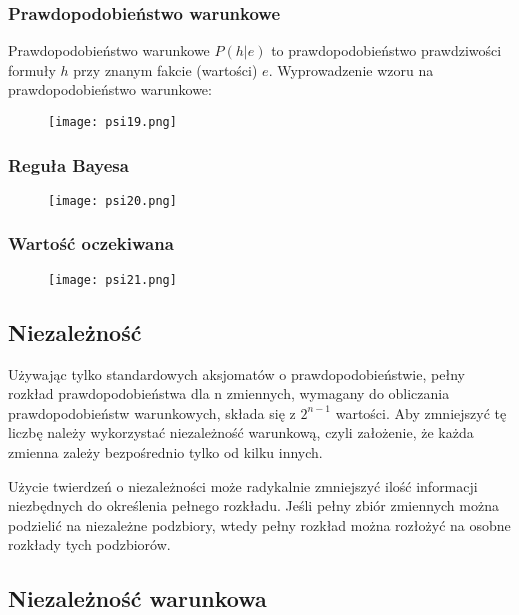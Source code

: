 \documentclass[a4paper,15pt]{article}
\begin{document}
\subsubsection{Prawdopodobieństwo warunkowe}
Prawdopodobieństwo warunkowe $P(h | e)$ to prawdopodobieństwo prawdziwości formuły $h$ przy znanym fakcie (wartości) $e$.
Wyprowadzenie wzoru na prawdopodobieństwo warunkowe:

\begin{figure}[H]
\centerline{\texttt{[image: psi19.png]}}
\end{figure}


\subsubsection{Reguła Bayesa}

\begin{figure}[H]
\centerline{\texttt{[image: psi20.png]}}
\end{figure}


\subsubsection{Wartość oczekiwana}

\begin{figure}[H]
\centerline{\texttt{[image: psi21.png]}}
\end{figure}

\subsection{Niezależność}

Używając tylko standardowych aksjomatów o prawdopodobieństwie, pełny rozkład prawdopodobieństwa dla n zmiennych, wymagany do obliczania prawdopodobieństw warunkowych, składa się z $2^{n-1}$ wartości. Aby zmniejszyć tę liczbę należy wykorzystać niezależność warunkową, czyli założenie, że każda zmienna zależy bezpośrednio tylko od kilku innych.

Użycie twierdzeń o niezależności może radykalnie zmniejszyć ilość informacji niezbędnych do określenia pełnego rozkładu. Jeśli pełny zbiór zmiennych można podzielić na niezależne podzbiory, wtedy pełny rozkład można rozłożyć na osobne rozkłady tych podzbiorów. 

\subsection{Niezależność warunkowa}
\end{document}
